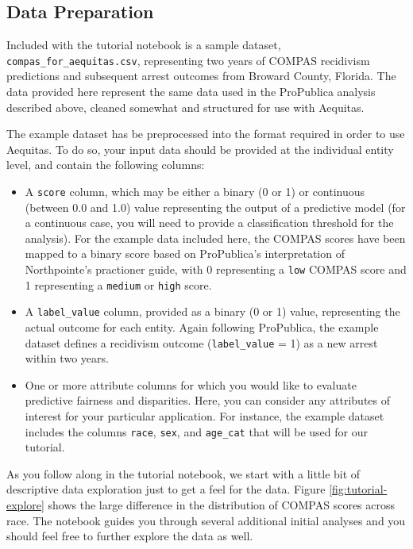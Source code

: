 \documentclass[]{krantz}
\begin{document}
\subsection{Data Preparation}\label{data-preparation}

Included with the tutorial notebook is a sample dataset,
\texttt{compas\_for\_aequitas.csv}, representing two years of COMPAS
recidivism predictions and subsequent arrest outcomes from Broward
County, Florida. The data provided here represent the same data used in
the ProPublica analysis described above, cleaned somewhat and structured
for use with Aequitas.

The example dataset has be preprocessed into the format required in
order to use Aequitas. To do so, your input data should be provided at
the individual entity level, and contain the following columns:

\begin{itemize}
\item
  A \texttt{score} column, which may be either a binary (0 or 1) or
  continuous (between 0.0 and 1.0) value representing the output of a
  predictive model (for a continuous case, you will need to provide a
  classification threshold for the analysis). For the example data
  included here, the COMPAS scores have been mapped to a binary score
  based on ProPublica's interpretation of Northpointe's practioner
  guide, with 0 representing a \texttt{low} COMPAS score and 1
  representing a \texttt{medium} or \texttt{high} score.
\item
  A \texttt{label\_value} column, provided as a binary (0 or 1) value,
  representing the actual outcome for each entity. Again following
  ProPublica, the example dataset defines a recidivism outcome
  (\texttt{label\_value} = 1) as a new arrest within two years.
\item
  One or more attribute columns for which you would like to evaluate
  predictive fairness and disparities. Here, you can consider any
  attributes of interest for your particular application. For instance,
  the example dataset includes the columns \texttt{race}, \texttt{sex},
  and \texttt{age\_cat} that will be used for our tutorial.
\end{itemize}

As you follow along in the tutorial notebook, we start with a little bit
of descriptive data exploration just to get a feel for the data. Figure
\ref{fig:tutorial-explore} shows the large difference in the
distribution of COMPAS scores across race. The notebook guides you
through several additional initial analyses and you should feel free to
further explore the data as well.
\end{document}
